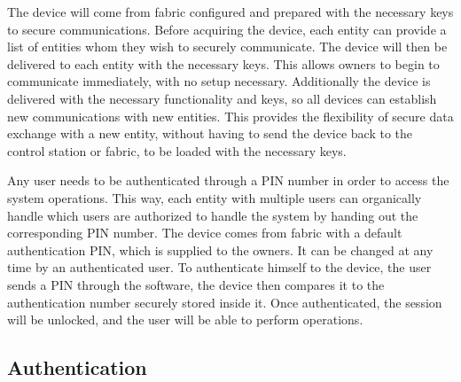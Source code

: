 
The device will come from fabric configured and prepared with the necessary keys to secure communications.
Before acquiring the device, each entity can provide a list of entities whom they wish to securely communicate. The device will then be delivered to each entity with the necessary keys. This allows owners to begin to communicate immediately, with no setup necessary.
Additionally the device is delivered with the necessary functionality and keys, so all devices can establish new communications with new entities. This provides the flexibility of secure data exchange with a new entity, without having to send the device back to the control station or fabric, to be loaded with the necessary keys.

Any user needs to be authenticated through a \ac{PIN} number in order to access the system operations. This way, each entity with multiple users can organically handle which users are authorized to handle the system by handing out the corresponding \ac{PIN} number.
The device comes from fabric with a default authentication \ac{PIN}, which is supplied to the owners. It can be changed at any time by an authenticated user.
To authenticate himself to the device, the user sends a \ac{PIN} through the software, the device then compares it to the authentication number securely stored inside it. Once authenticated, the session will be unlocked, and the user will be able to perform operations.

\subsection{Authentication}\label{chap:arch:services:auth}

